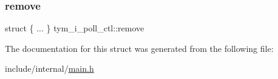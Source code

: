 \subsubsection{\texorpdfstring{remove}{remove}}
{\footnotesize\ttfamily struct \{ ... \}   tym\+\_\+i\+\_\+poll\+\_\+ctl\+::remove}



The documentation for this struct was generated from the following file\+:\begin{DoxyCompactItemize}
\item 
include/internal/\hyperlink{main_8h}{main.\+h}\end{DoxyCompactItemize}
